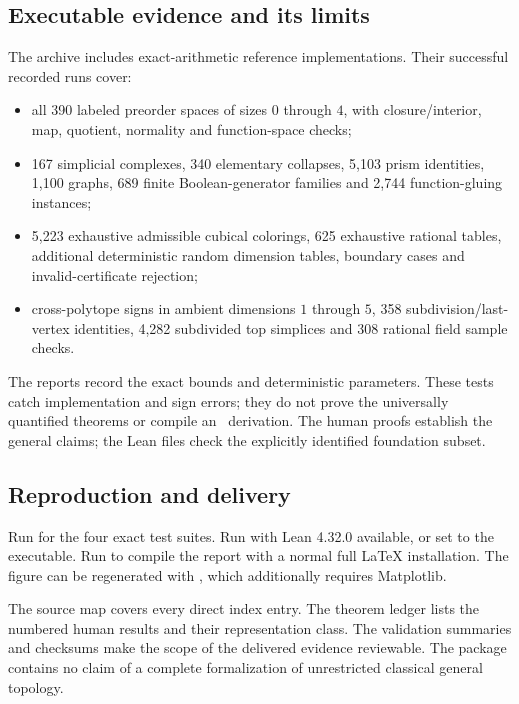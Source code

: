 \subsection{Executable evidence and its limits}

The archive includes exact-arithmetic reference implementations. Their successful recorded runs cover:
\begin{itemize}
\item all 390 labeled preorder spaces of sizes $0$ through $4$, with closure/interior, map, quotient, normality and function-space checks;
\item 167 simplicial complexes, 340 elementary collapses, 5,103 prism identities, 1,100 graphs, 689 finite Boolean-generator families and 2,744 function-gluing instances;
\item 5,223 exhaustive admissible cubical colorings, 625 exhaustive rational tables, additional deterministic random dimension tables, boundary cases and invalid-certificate rejection;
\item cross-polytope signs in ambient dimensions $1$ through $5$, 358 subdivision/last-vertex identities, 4,282 subdivided top simplices and 308 rational field sample checks.
\end{itemize}
The reports record the exact bounds and deterministic parameters. These tests catch implementation and sign errors; they do not prove the universally quantified theorems or compile an \ipra\ derivation. The human proofs establish the general claims; the Lean files check the explicitly identified foundation subset.

\subsection{Reproduction and delivery}

Run  for the four exact test suites. Run
 with Lean 4.32.0 available, or set  to the executable. Run  to compile the report with a normal full LaTeX installation. The figure can be regenerated with , which additionally requires Matplotlib.

The source map covers every direct index entry. The theorem ledger lists the numbered human results and their representation class. The validation summaries and checksums make the scope of the delivered evidence reviewable. The package contains no claim of a complete formalization of unrestricted classical general topology.

